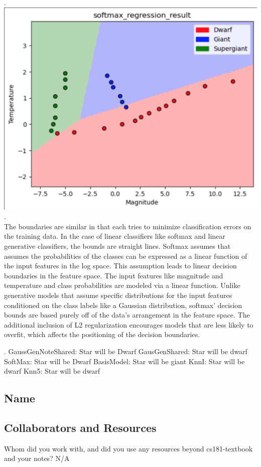 \documentclass[submit]{harvardml}
\begin{document}
\pagebreak
{}. \includegraphics[width=0.5\linewidth]{hw2/softmax.png}. \\ The boundaries are similar in that each tries to minimize classification errors on the training data. In the case of linear classifiers like softmax and linear generative classifiers, the bounds are straight lines. Softmax assumes that assumes the probabilities of the classes can be expressed as a linear function of the input features in the log space. This assumption leads to linear decision boundaries in the feature space. The input features like magnitude and temperature and class probabilities are modeled via a linear function.  Unlike generative models that assume specific distributions for the input features conditioned on the class labels like a Gaussian distribution, softmax' decision bounds are based purely off of the data's arrangement in the feature space. The additional inclusion of L2 regularization encourages models that are less likely to overfit, which affects the positioning of the decision boundaries. 

. GaussGenNoteShared: Star will be Dwarf
GausGenShared: Star will be dwarf
SoftMax: Star will be Dwarf BasisModel: Star will be giant
KnnI: Star will be dwarf
Knn5: Star will be dwarf

\subsection*{Name}

\subsection*{Collaborators and Resources}
Whom did you work with, and did you use any resources beyond cs181-textbook and your notes? N/A 
\end{document}
